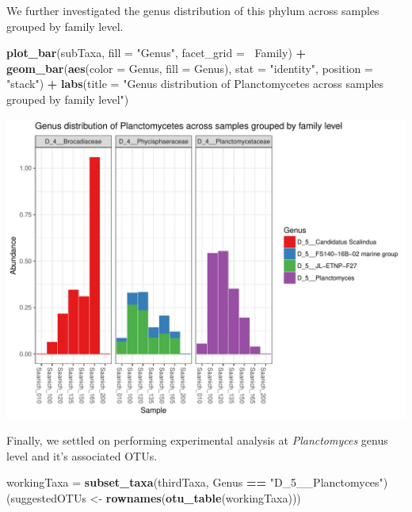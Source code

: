 \documentclass[11 pt,]{article}
\newenvironment{Shaded}{\begin{snugshade}}{\end{snugshade}}
\newcommand{\KeywordTok}[1]{\textcolor[rgb]{0.13,0.29,0.53}{\textbf{#1}}}
\newcommand{\DataTypeTok}[1]{\textcolor[rgb]{0.13,0.29,0.53}{#1}}
\newcommand{\StringTok}[1]{\textcolor[rgb]{0.31,0.60,0.02}{#1}}
\newcommand{\OperatorTok}[1]{\textcolor[rgb]{0.81,0.36,0.00}{\textbf{#1}}}
\newcommand{\NormalTok}[1]{#1}
\begin{document}
We further investigated the genus distribution of this phylum across
samples grouped by family level.

\begin{Shaded}
\begin{Highlighting}[]
\KeywordTok{plot_bar}\NormalTok{(subTaxa, }\DataTypeTok{fill =} \StringTok{"Genus"}\NormalTok{, }\DataTypeTok{facet_grid =} \OperatorTok{~}\NormalTok{Family) }\OperatorTok{+}\StringTok{ }\KeywordTok{geom_bar}\NormalTok{(}\KeywordTok{aes}\NormalTok{(}\DataTypeTok{color =}\NormalTok{ Genus, }
    \DataTypeTok{fill =}\NormalTok{ Genus), }\DataTypeTok{stat =} \StringTok{"identity"}\NormalTok{, }\DataTypeTok{position =} \StringTok{"stack"}\NormalTok{) }\OperatorTok{+}\StringTok{ }\KeywordTok{labs}\NormalTok{(}\DataTypeTok{title =} \StringTok{"Genus distribution of Planctomycetes across samples grouped by family level"}\NormalTok{)}
\end{Highlighting}
\end{Shaded}

\includegraphics{Figs/unnamed-chunk-10-1.pdf}

Finally, we settled on performing experimental analysis at
\emph{Planctomyces} genus level and it's associated OTUs.

\begin{Shaded}
\begin{Highlighting}[]
\NormalTok{workingTaxa =}\StringTok{ }\KeywordTok{subset_taxa}\NormalTok{(thirdTaxa, Genus }\OperatorTok{==}\StringTok{ "D_5__Planctomyces"}\NormalTok{)}
\NormalTok{(suggestedOTUs <-}\StringTok{ }\KeywordTok{rownames}\NormalTok{(}\KeywordTok{otu_table}\NormalTok{(workingTaxa)))}
\end{Highlighting}
\end{Shaded}
\end{document}
